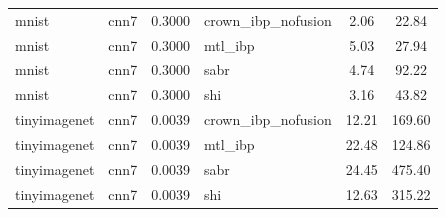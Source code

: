 \begin{tabular}{llllcc}
mnist & cnn7 & 0.3000 & crown\_ibp\_nofusion & 2.06 & 22.84 \\
mnist & cnn7 & 0.3000 & mtl\_ibp & 5.03 & 27.94 \\
mnist & cnn7 & 0.3000 & sabr & 4.74 & 92.22 \\
mnist & cnn7 & 0.3000 & shi & 3.16 & 43.82 \\
tinyimagenet & cnn7 & 0.0039 & crown\_ibp\_nofusion & 12.21 & 169.60 \\
tinyimagenet & cnn7 & 0.0039 & mtl\_ibp & 22.48 & 124.86 \\
tinyimagenet & cnn7 & 0.0039 & sabr & 24.45 & 475.40 \\
tinyimagenet & cnn7 & 0.0039 & shi & 12.63 & 315.22 \\
\bottomrule
\end{tabular}